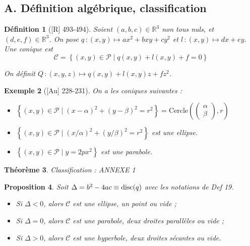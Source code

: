 \documentclass[10pt, a4paper, parskip=full, twoside, twocolumn]{report}
\newtheorem{definition}{Définition}
\newtheorem{theorem}[definition]{Théorème}
\newtheorem{proposition}[definition]{Proposition}
\newtheorem{example}[definition]{Exemple}
\newcommand{\IR}{\mathbb{R}}
\begin{document}
\subsection*{A. Définition algébrique, classification}
\begin{definition}[\textnormal{[R] 493-494}]
	Soient $(a,b,c)\in\IR^3$ non tous nuls, et $(d,e,f)\in\IR^3$.
	On pose $q\,\colon (x,y)\mapsto ax^2+bxy+cy^2$ et $l\,\colon(x,y)\mapsto dx+ey$.
	Une \emph{conique} est 
	$$\mathcal{C} = \left\{(x,y)\in \mathcal{P} \mid q(x,y)+l(x,y)+f = 0\right\}$$

	On définit $Q\,\colon (x,y,z) \mapsto q(x,y)+l(x,y)z + fz^2$.
\end{definition}

\begin{example}[\textnormal{[Au] 228-231}]
	On a les coniques suivantes :
	\begin{itemize}
		\item $\left\{(x,y)\in\mathcal{P} \mid (x-\alpha)^2+(y-\beta)^2 = r^2\right\} = \text{Cercle}\left(\begin{pmatrix}
			\alpha \\ \beta
		\end{pmatrix}, r\right)$
		\item $\left\{(x,y)\in\mathcal{P} \mid (x/\alpha)^2+(y/\beta)^2 = r^2\right\}$ est une ellipse.
		\item $\left\{(x,y)\in\mathcal{P} \mid y = 2px^2\right\}$ est une parabole.
	\end{itemize}
\end{example}

\begin{theorem}
	Classification : \textcolor{paragraphtext}{ANNEXE 1}
\end{theorem}

\begin{proposition}
	Soit $\Delta = b^2 - 4ac \equiv \textnormal{disc}(q)$ avec les notations de Def 19.
	\begin{itemize}
		\item Si $\Delta < 0$, alors $\mathcal{C}$ est une ellipse, un point ou vide ;
		\item Si $\Delta = 0$, alors $\mathcal{C}$ est une parabole, deux droites parallèles ou vide ;
		\item Si $\Delta > 0$, alors $\mathcal{C}$ est une hyperbole, deux droites sécantes ou vide.
	\end{itemize}
\end{proposition}
\end{document}
